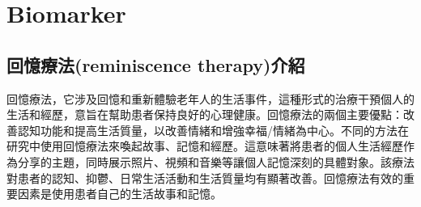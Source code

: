\chapter{Biomarker}
\label{chapter:intro}
\section{回憶療法(reminiscence therapy)介紹}
回憶療法，它涉及回憶和重新體驗老年人的生活事件，這種形式的治療干預個人的生活和經歷，意旨在幫助患者保持良好的心理健康。回憶療法的兩個主要優點：改善認知功能和提高生活質量，以改善情緒和增強幸福/情緒為中心。不同的方法在研究中使用回憶療法來喚起故事、記憶和經歷。這意味著將患者的個人生活經歷作為分享的主題，同時展示照片、視頻和音樂等讓個人記憶深刻的具體對象。該療法對患者的認知、抑鬱、日常生活活動和生活質量均有顯著改善。回憶療法有效的重要因素是使用患者自己的生活故事和記憶。

